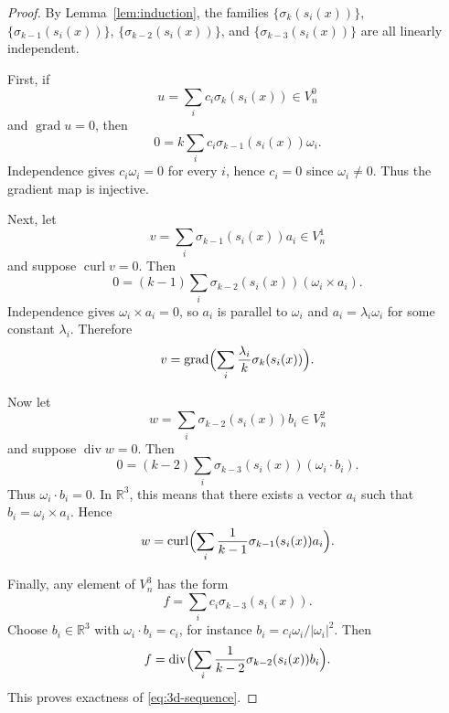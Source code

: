 \documentclass[pdflatex,sn-mathphys-num]{sn-jnl}
\numberwithin{equation}{section}
\numberwithin{theorem}{section}
\numberwithin{table}{section}
\numberwithin{figure}{section}
\begin{document}
\begin{proof}
    By Lemma~\ref{lem:induction}, the families
    $\{\sigma_k(s_i(x))\}$, $\{\sigma_{k-1}(s_i(x))\}$, $\{\sigma_{k-2}(s_i(x))\}$, and
    $\{\sigma_{k-3}(s_i(x))\}$ are all linearly independent.
    
    First, if
    \begin{equation}
    u=\sum_i c_i\sigma_k(s_i(x))\in V_n^0
    \end{equation}
    and $\operatorname{grad} u=0$, then
    \begin{equation}
    0=k\sum_i c_i\sigma_{k-1}(s_i(x))\omega_i.
    \end{equation}
    Independence gives $c_i\omega_i=0$ for every $i$, hence $c_i=0$ since $\omega_i\neq0$. Thus the gradient map is injective.
    
    Next, let
    \begin{equation}
    v=\sum_i \sigma_{k-1}(s_i(x))a_i\in V_n^1
    \end{equation}
    and suppose $\operatorname{curl}v=0$.  Then
    \begin{equation}
    0=(k-1)\sum_i \sigma_{k-2}(s_i(x))(\omega_i\times a_i).
    \end{equation}
    Independence gives $\omega_i\times a_i=0$, so $a_i$ is parallel to $\omega_i$ and
    $a_i=\lambda_i\omega_i$ for some constant $\lambda_i$.  Therefore
    \begin{equation}
    v=\operatorname{grad}\Bigl(\sum_i \frac{\lambda_i}{k}\sigma_k(s_i(x))\Bigr).
    \end{equation}
    
    Now let
    \begin{equation}
    w=\sum_i \sigma_{k-2}(s_i(x))b_i\in V_n^2
    \end{equation}
    and suppose $\operatorname{div}w=0$.  Then
    \begin{equation}
    0=(k-2)\sum_i \sigma_{k-3}(s_i(x))(\omega_i\cdot b_i).
    \end{equation}
    Thus $\omega_i\cdot b_i=0$.  In $\mathbb  R ^3$, this means that there exists a vector $a_i$
    such that $b_i=\omega_i\times a_i$.  Hence
    \begin{equation}
    w=\operatorname{curl}\Bigl(\sum_i \frac{1}{k-1}\sigma_{k-1}(s_i(x))a_i\Bigr).
    \end{equation}
    
    Finally, any element of $V_n^3$ has the form
    \begin{equation}
    f=\sum_i c_i\sigma_{k-3}(s_i(x)).
    \end{equation}
    Choose $b_i\in\mathbb  R  ^3$ with $\omega_i\cdot b_i=c_i$, for instance
    $b_i=c_i\omega_i/|\omega_i|^2$.  Then
    \begin{equation}
    f=\operatorname{div}\Bigl(\sum_i \frac{1}{k-2}\sigma_{k-2}(s_i(x))b_i\Bigr).
    \end{equation}
    This proves exactness of \eqref{eq:3d-sequence}.
\end{proof}
\end{document}
